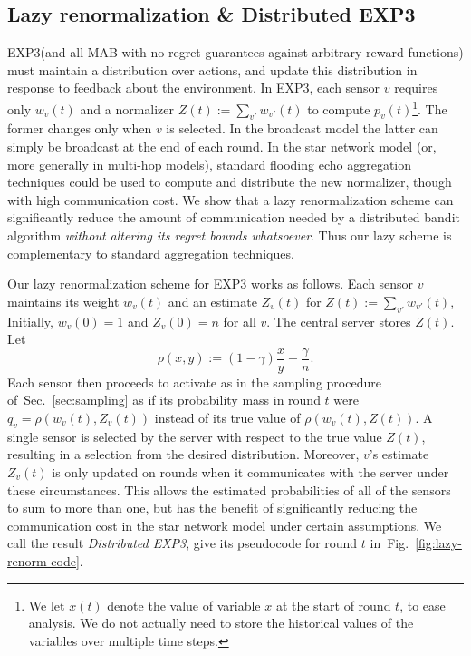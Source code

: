 \documentclass{sig-alternate-dan}
\numberwithin{equation}{section}
\newcommand{\algofont}[1]{\textsc{#1}}
\newcommand{\EXPthree}{{\algofont{EXP3}}\xspace}
\newcommand{\numsensors}{\ensuremath{n}}
\newcommand{\sensor}{\ensuremath{v}}
\newcommand{\ignore}[1]{}
\newcommand{\figref}[1]{Fig.~\ref{#1}}
\newcommand{\secref}[1]{Sec.~\ref{#1}}
\begin{document}
%
%
%

\vspace{-1mm}
\subsection{Lazy renormalization \& Distributed EXP3} \label{ssec:lazy}
%
\EXPthree (and all MAB with no-regret guarantees against arbitrary
reward functions) must maintain a distribution over actions, and
update this distribution in response to feedback about the
environment.
%
%
%
%
%
%
%
In \EXPthree, each sensor $\sensor$ requires only $w_{\sensor}(t)$ and
a normalizer $Z(t) :=\sum_{\sensor'}w_{\sensor'}(t)$ to compute
$p_{\sensor}(t)$\footnote{We let $x(t)$ denote the value of variable
$x$ at the start of round $t$, to ease analysis.  We do not actually
need to store the historical values of the variables over multiple time steps.}.  The
former changes only when $\sensor$ is selected. In the broadcast model
the latter can simply be broadcast at the end of each round. In the
star network model (or, more generally in multi-hop models), standard
flooding echo aggregation techniques could be used to compute and
distribute the new normalizer, though with high communication cost. We
show that a lazy renormalization scheme can significantly reduce the
amount of communication needed by a distributed bandit algorithm
\emph{without altering its regret bounds whatsoever}. Thus our lazy
scheme is complementary to standard aggregation techniques.
%
\ignore{ In the
broadcast model the latter can simply be broadcast at the end of each
round, however things are not so easy in the star network model.
Nevertheless, in this section we show that for \EXPthree (and many
algorithms like it), we can perform the necessary renormalization in a
lazy manner that keeps the amount of communication quite low.
}

Our lazy renormalization scheme for \EXPthree works as follows.  Each
sensor $\sensor$ maintains its weight $w_{\sensor}(t)$ and an estimate
$Z_{\sensor}(t)$ for $Z(t) := \sum_{\sensor'}w_{\sensor'}(t)$,
Initially, $w_{\sensor}(0) = 1$ and $Z_{\sensor}(0) = \numsensors$ for
all $\sensor$.  The central server stores $Z(t)$.
%
%
Let 
\[
\rho(x, y) := (1-\gamma)\frac{x}{y} + \frac{\gamma}{\numsensors}\mbox{.}
\]
Each sensor then proceeds to activate as in the sampling procedure 
of~\secref{sec:sampling} as if its probability mass in round $t$
were $q_{\sensor} = \rho(w_{\sensor}(t), Z_{\sensor}(t))$ instead of its true
value of $\rho(w_{\sensor}(t), Z(t))$. A single sensor is selected by
the server with respect to the true value $Z(t)$, resulting in a
selection from the desired distribution. Moreover, $\sensor$'s estimate 
$Z_{\sensor}(t)$ is only updated on rounds when it communicates with
the server under these circumstances.  This allows the estimated
probabilities of all of the sensors to sum to more than one, but has
the benefit of significantly reducing the communication cost in the
star network model under certain assumptions.  
We call the result \emph{Distributed EXP3}, give its pseudocode 
for round $t$ in~\figref{fig:lazy-renorm-code}.
\end{document}
